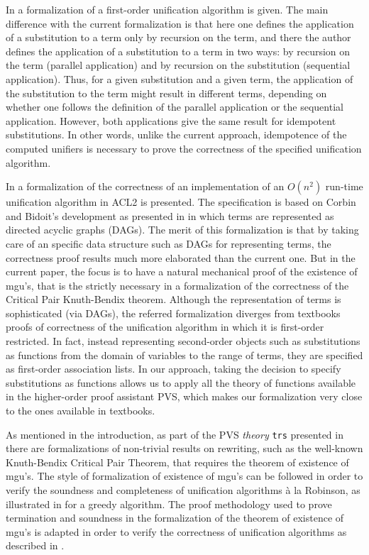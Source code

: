 \documentclass[submission,copyright,creativecommons]{eptcs}
\begin{document}
  In \cite{Bove1999} a formalization of a first-order unification
  algorithm is given. The main difference with the current formalization is
  that here one defines the application of a substitution to a term only by
  recursion on the term, and there the author defines the application of a
  substitution to a term in two ways: by recursion on the term
  (parallel application) and by recursion on the substitution
  (sequential application). Thus, for a given substitution and a given
  term, the application of the substitution to the term might result
  in different terms, depending on whether one follows the definition
  of the parallel application or the sequential application. However,
  both applications give the same result for idempotent
  substitutions. In other words, unlike the current approach, idempotence of
  the computed unifiers is necessary to prove the correctness of the
  specified unification algorithm.

  In \cite{RRMMAH2006} a formalization of the correctness of an
  implementation of an $O(n^2)$ run-time unification algorithm in ACL2
  is presented. The specification is based on Corbin and Bidoit's
  development \cite{CoBi83} as presented in \cite{BaNi98} in which
  terms are represented as directed acyclic graphs (DAGs). The merit
  of this formalization is that by taking care of an specific data
  structure such as DAGs for representing terms, the correctness proof
  results much more elaborated than the current one. But in the
  current paper, the focus is to have a natural mechanical proof of
  the existence of mgu's, that is the strictly necessary in a
  formalization of the correctness of the Critical Pair Knuth-Bendix
  theorem. Although the representation of terms is sophisticated (via
  DAGs), the referred formalization diverges from textbooks proofs of
  correctness of the unification algorithm in which it is first-order
  restricted. In fact, instead representing second-order objects such
  as substitutions as functions from the domain of variables to the
  range of terms, they are specified as first-order association
  lists. In our approach, taking the decision to specify substitutions
  as functions allows us to apply all the theory of functions
  available in the higher-order proof assistant PVS, which makes our
  formalization very close to the ones available in textbooks.

  As mentioned in the introduction, as part of the PVS \emph{theory}
  {\color{blue} \tt trs} presented in \cite{GaAR2008b} there are
  formalizations of non-trivial results on rewriting, such as the
  well-known Knuth-Bendix Critical Pair Theorem, that
  requires the theorem of existence of mgu's. The style of formalization
  of existence of mgu's can be followed in order to verify the soundness
  and completeness of unification algorithms \`{a} la Robinson, as
  illustrated in \cite{AMARG2010} for a greedy algorithm.
  The proof methodology used to prove termination and soundness in the
  formalization of the theorem of existence of mgu's is adapted in
  order to verify the correctness of unification algorithms as
  described in \cite{AMARG2010}.
\end{document}
